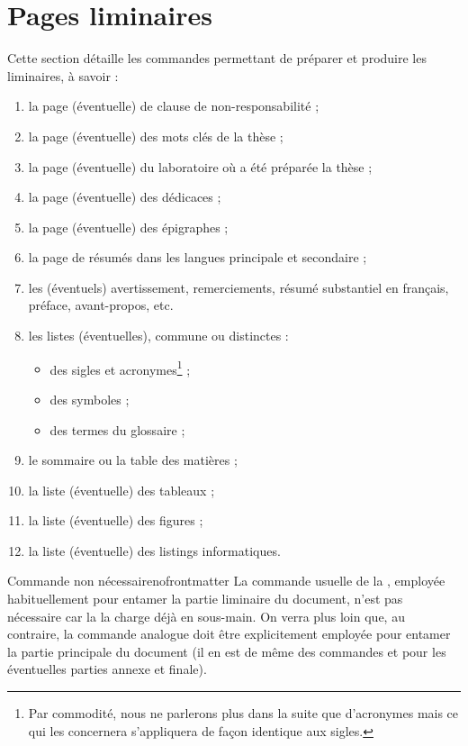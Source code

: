 \chapter{Pages liminaires}\label{cha:liminaires}

Cette section détaille les commandes permettant de préparer et produire les
\glspl{liminaire}, à savoir :
\begin{enumerate}
\item la page (éventuelle) de clause de non-responsabilité ;
\item la page (éventuelle) des mots clés de la thèse ;
\item la page (éventuelle) du laboratoire où a été préparée la thèse ;
\item la page (éventuelle) des dédicaces ;
\item la page (éventuelle) des épigraphes ;
\item la page de résumés dans les langues principale et secondaire ;
\item les (éventuels) avertissement, remerciements, résumé substantiel en
  français, préface, avant-propos, etc.
\item les listes (éventuelles), commune ou distinctes :
  \begin{itemize}
  \item des sigles et acronymes\footnote{Par commodité, nous ne parlerons plus
      dans la suite que d'acronymes mais ce qui les concernera s'appliquera de
      façon identique aux sigles.} ;
  \item des symboles ;
  \item des termes du glossaire ;
  \end{itemize}
\item le sommaire ou la table des matières ;
\item la liste (éventuelle) des tableaux ;
\item la liste (éventuelle) des figures ;
\item la liste (éventuelle) des listings informatiques.
\end{enumerate}

\begin{dbremark}{Commande \protect{} non nécessaire}{nofrontmatter}
  La commande  usuelle de la , employée
  habituellement pour entamer la partie liminaire du document, n'est pas
  nécessaire car la \yatcl{} la charge déjà en sous-main. On verra plus loin
  que, au contraire, la commande analogue  doit être
  explicitement employée pour entamer la partie principale du document (il en
  est de même des commandes  et  pour les
  éventuelles parties annexe et finale).
\end{dbremark}

